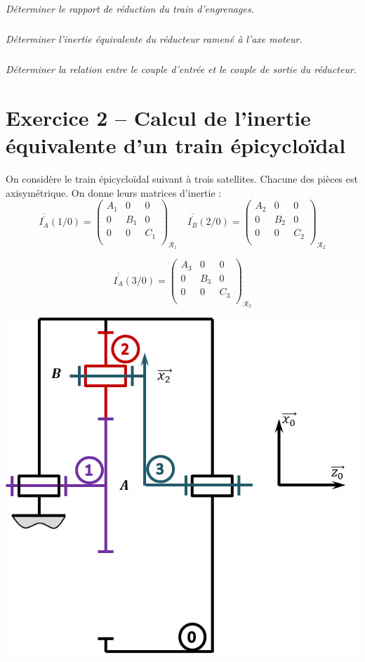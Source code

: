 \documentclass[10pt,fleqn]{article} %
\begin{document}
\begin{multicols}{2}
\subparagraph{}
\textit{Déterminer le rapport de réduction du train d'engrenages.}

\subparagraph{}
\textit{Déterminer l'inertie équivalente du réducteur ramené à l'axe moteur.}

\subparagraph{}
\textit{Déterminer la relation entre le couple d'entrée et le couple de sortie du réducteur.}

\section*{Exercice 2 -- Calcul de l'inertie équivalente d'un train épicycloïdal}
\setcounter{exo}{0}

On considère le train épicycloïdal suivant à trois satellites. Chacune des pièces est axisymétrique. On donne leurs matrices d'inertie :
$$
\overline{\overline{I_A}}(1/0) = 
\begin{pmatrix} 
A_1 & 0 & 0 \\
0 & B_1 & 0 \\
0 & 0 & C_1 \\
\end{pmatrix}_{\mathcal{R}_1}
\quad
\overline{\overline{I_B}}(2/0) = 
\begin{pmatrix} 
A_2 & 0 & 0 \\
0 & B_2 & 0 \\
0 & 0 & C_2 \\
\end{pmatrix}_{\mathcal{R}_2}
$$

$$
\overline{\overline{I_A}}(3/0) = 
\begin{pmatrix} 
A_3 & 0 & 0 \\
0 & B_3 & 0 \\
0 & 0 & C_3 \\
\end{pmatrix}_{\mathcal{R}_3}
$$

\begin{center}
\includegraphics[width=.45\textwidth]{images/train_01}
\end{center}


\end{multicols}
\end{document}

